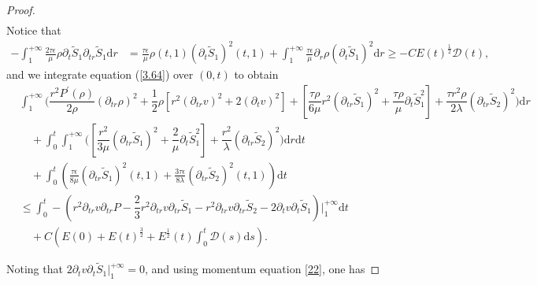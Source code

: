 \documentclass[10pt,reqno]{amsart}
\numberwithin{equation}{section}
\begin{document}
\begin{proof}
\begin{equation}
\begin{aligned}
			\end{aligned}
		\end{equation}
		Notice that
		\begin{equation}\nonumber
			\begin{aligned}
				-\int_{1}^{+\infty}\frac{2\tau\epsilon}{\mu}\rho\partial_{t}\tilde{S}_1
				\partial_{tr}\tilde{S}_1\mathrm{d}r
				&=\frac{\tau\epsilon}{\mu}\rho(t,1)(\partial_{t}\tilde{S}_1)^2(t,1)
				+\int_{1}^{+\infty}\frac{\tau\epsilon}{\mu}\partial_r\rho(\partial_{t}\tilde{S}_1)^2
				\mathrm{d}r
				\geq %
				-C E(t)^{\frac{1}{2}}\mathcal{D}(t),
			\end{aligned}
		\end{equation}
		and we integrate equation (\ref{3.64}) over $(0,t)$ to obtain
		\begin{equation}\nonumber
			\begin{aligned}
				&\int_{1}^{+\infty}\bigg(\dfrac{r^2 P^{\prime}(\rho)}{2\rho} \left(\partial_{tr} \rho\right)^2 +\dfrac{1}{2}\rho\left[r^2 (\partial_{tr}v)^2+2 (\partial_{t}v)^2\right]+ \left[\dfrac{\tau\rho}{6\mu} r^2(\partial_{tr}\tilde{S}_1)^2+\dfrac{\tau\rho}{\mu} \partial_{t}\tilde{S}_1^2\right]
				+\dfrac{\tau r^2\rho}{2\lambda} (\partial_{tr} \tilde{S}_2)^2\bigg)\mathrm{d}r\\
				&\quad+\int_{0}^{t}\int_{1}^{+\infty}\bigg(\left[\dfrac{r^2}{3\mu}(\partial_{tr}\tilde{S}_1)^2+\dfrac{2}{\mu} \partial_{t}\tilde{S}_1^2\right]
				+\dfrac{r^2}{\lambda}(\partial_{tr}\tilde{S}_2)^2\bigg)\mathrm{d}r\mathrm{d}t\\
				&\quad+\int_{0}^{t}\left(\frac{\tau\epsilon}{8\mu}(\partial_{tr}\tilde{S}_1)^2(t,1)
				+\frac{3\tau\epsilon}{8\lambda}(\partial_{tr}\tilde{S}_2)^2(t,1)\right)\mathrm{d}t\\
				&\leq 
				\int_{0}^{t}-\left(r^2\partial_{tr}v \partial_{tr}P
				-\dfrac{2}{3} r^2  \partial_{tr}v \partial_{tr}\tilde{S}_1
				-r^2  \partial_{tr}v \partial_{tr}\tilde{S}_2
				-2\partial_{t}v\partial_{t}\tilde{S}_1\right)\bigg|_{1}^{+\infty} \mathrm{d}t\\
				&\quad+C\left(E(0)+E(t)^{\frac{3}{2}}+ E^{\frac{1}{2}}(t) \int_{0}^t \mathcal{D}(s)\mathrm{d}s\right)
				.
			\end{aligned}
		\end{equation}
		
		Noting that $2\partial_{t}v\partial_{t}\tilde{S}_1\big|_{1}^{+\infty}=0$, and using momentum equation \eqref{22}, one has
		

\end{proof}
\end{document}
